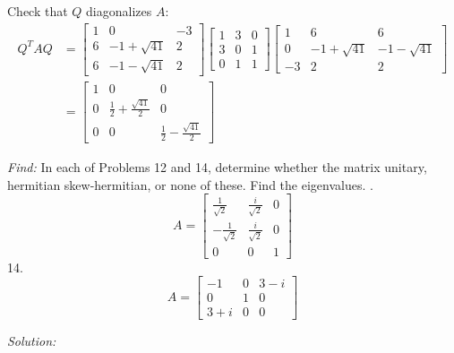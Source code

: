 \documentclass[11pt]{homework}
\begin{document}
Check that $Q$ diagonalizes $A$:
\begin{align*}
Q^T A Q &=
  \begin{bmatrix}
  1 & 0 & -3 \\
  6 & -1+\sqrt{41} & 2 \\
  6 & -1-\sqrt{41} & 2 
  \end{bmatrix}
  \begin{bmatrix}
  1 & 3 & 0 \\
  3 & 0 & 1 \\
  0 & 1 & 1
  \end{bmatrix}
  \begin{bmatrix}
  1 & 6 & 6 \\
  0 & -1+\sqrt{41} & -1-\sqrt{41} \\
  -3 & 2 & 2
  \end{bmatrix} \\
  &=
  \begin{bmatrix}
  1 & 0 & 0 \\
  0 & \frac{1}{2}+\frac{\sqrt{41}}{2} & 0 \\
  0 & 0 & \frac{1}{2}-\frac{\sqrt{41}}{2}
  \end{bmatrix}
\end{align*}

\emph{Find:}
\newline
In each of Problems 12 and 14, 
determine whether the matrix unitary, hermitian
skew-hermitian, or none of these.
Find the eigenvalues.
.
\begin{equation*}
  A = 
  \begin{bmatrix}
  \frac{1}{\sqrt{2}} & \frac{i}{\sqrt{2}} & 0 \\
  -\frac{1}{\sqrt{2}} & \frac{i}{\sqrt{2}} & 0 \\
  0 & 0 & 1
  \end{bmatrix}
\end{equation*}
14. 
\begin{equation*}
A = 
  \begin{bmatrix}
  -1 & 0 & 3-i \\
  0 & 1 & 0 \\
  3+i & 0 & 0
  \end{bmatrix}
\end{equation*}

\emph{Solution:}
\newline
\end{document}
